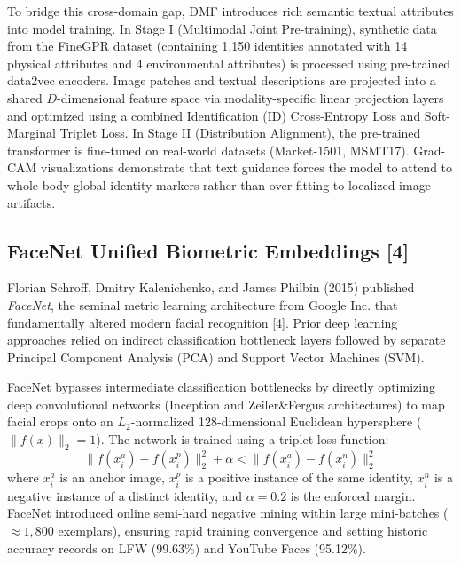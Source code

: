 \documentclass[12pt,a4paper]{report}
\begin{document}
To bridge this cross-domain gap, DMF introduces rich semantic textual attributes into model training. In Stage I (Multimodal Joint Pre-training), synthetic data from the FineGPR dataset (containing 1,150 identities annotated with 14 physical attributes and 4 environmental attributes) is processed using pre-trained data2vec encoders. Image patches and textual descriptions are projected into a shared $D$-dimensional feature space via modality-specific linear projection layers and optimized using a combined Identification (ID) Cross-Entropy Loss and Soft-Marginal Triplet Loss. In Stage II (Distribution Alignment), the pre-trained transformer is fine-tuned on real-world datasets (Market-1501, MSMT17). Grad-CAM visualizations demonstrate that text guidance forces the model to attend to whole-body global identity markers rather than over-fitting to localized image artifacts.

\subsection{FaceNet Unified Biometric Embeddings [4]}
Florian Schroff, Dmitry Kalenichenko, and James Philbin (2015) published \textit{FaceNet}, the seminal metric learning architecture from Google Inc. that fundamentally altered modern facial recognition [4]. Prior deep learning approaches relied on indirect classification bottleneck layers followed by separate Principal Component Analysis (PCA) and Support Vector Machines (SVM). 

FaceNet bypasses intermediate classification bottlenecks by directly optimizing deep convolutional networks (Inception and Zeiler\&Fergus architectures) to map facial crops onto an $L_2$-normalized 128-dimensional Euclidean hypersphere ($\|f(x)\|_2 = 1$). The network is trained using a triplet loss function:
\begin{equation}
    \|f(x_i^a) - f(x_i^p)\|_2^2 + \alpha < \|f(x_i^a) - f(x_i^n)\|_2^2
\end{equation}
where $x_i^a$ is an anchor image, $x_i^p$ is a positive instance of the same identity, $x_i^n$ is a negative instance of a distinct identity, and $\alpha = 0.2$ is the enforced margin. FaceNet introduced online semi-hard negative mining within large mini-batches ($\approx 1,800$ exemplars), ensuring rapid training convergence and setting historic accuracy records on LFW (99.63\%) and YouTube Faces (95.12\%).
\end{document}
